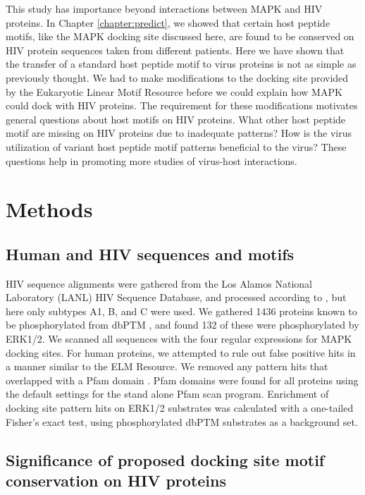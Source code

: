 This study has importance beyond interactions between MAPK and HIV
proteins. In Chapter \ref{chapter:predict}, we showed that certain
host peptide motifs, like the MAPK docking site discussed here, are
found to be conserved on HIV protein sequences taken from different
patients. Here we have shown that the transfer of a standard host
peptide motif to virus proteins is not as simple as previously
thought. We had to make modifications to the docking site provided by
the Eukaryotic Linear Motif Resource before we could explain how MAPK
could dock with HIV proteins. The requirement for these modifications
motivates general questions about host motifs on HIV proteins. What
other host peptide motif are missing on HIV proteins due to inadequate
patterns? How is the virus utilization of variant host peptide motif
patterns beneficial to the virus? These questions help in promoting
more studies of virus-host interactions.

\section{Methods}

\subsection{Human and HIV sequences and motifs}

HIV sequence alignments were gathered from the Los Alamos National
Laboratory (LANL) HIV Sequence Database, and processed according to
\cite{evans09}, but here only subtypes A1, B, and C were used. We
gathered 1436 proteins known to be phosphorylated from dbPTM
\cite{lee06}, and found 132 of these were phosphorylated by ERK1/2. We
scanned all sequences with the four regular expressions for MAPK
docking sites. For human proteins, we attempted to rule out false
positive hits in a manner similar to the ELM Resource. We removed any
pattern hits that overlapped with a Pfam domain \cite{finn08}. Pfam
domains were found for all proteins using the default settings for the
stand alone Pfam scan program. Enrichment of docking site pattern hits
on ERK1/2 substrates was calculated with a one-tailed Fisher's exact
test, using phosphorylated dbPTM substrates as a background set.

\subsection{Significance of proposed docking site motif conservation on HIV proteins}

